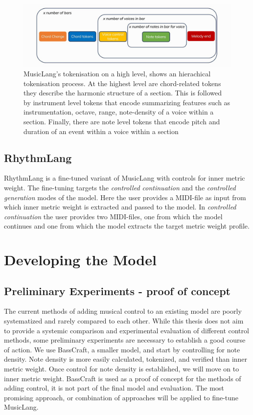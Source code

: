 \begin{figure}[H]
    \centering
    \includegraphics[width=1\textwidth]{IMAGES/MusicLang.JPG} 
    \caption{MusicLang's tokenisation on a high level, shows an hierachical tokenisation process. At the highest level are chord-related tokens they describe the harmonic structure of a section. This is followed by instrument level tokens that encode summarizing features such as instrumentation, octave, range, note-density of a voice within a section. Finally, there are note level tokens that encode pitch and duration of an event within a voice within a section}
    \label{fig:musiclangtok}
\end{figure}

\subsection{RhythmLang}
RhythmLang is a fine-tuned variant of MusicLang with controls for inner metric weight. The fine-tuning targets the \textit{controlled continuation} and the \textit{controlled generation} modes of the model. Here the user provides a MIDI-file as input from which inner metric weight is extracted and passed to the model. In \textit{controlled continuation} the user provides two MIDI-files, one from which the model continues and one from which the model extracts the target metric weight profile. 

\section{Developing the Model}

\subsection{Preliminary Experiments - proof of concept}
The current methods of adding musical control to an existing model are poorly systematized and rarely compared to each other. While this thesis does not aim to provide a systemic comparison and experimental evaluation of different control methods, some preliminary experiments are necessary to establish a good course of action. We use BassCraft, a smaller model, and start by controlling for note density. Note density is more easily calculated, tokenized, and verified than inner metric weight. Once control for note density is established, we will move on to inner metric weight.  BassCraft is used as a proof of concept for the methods of adding control, it is not part of the final model and evaluation. The most promising approach, or combination of approaches will be applied to fine-tune MusicLang. 

